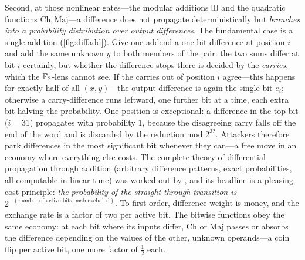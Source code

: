 Second, at those nonlinear gates---the modular additions $\boxplus$ and
the quadratic functions $\mathrm{Ch}, \mathrm{Maj}$---a difference does
not propagate deterministically but \emph{branches into a probability
distribution over output differences}. The fundamental case is a single
addition (\cref{fig:diffadd}). Give one addend a one-bit difference at
position $i$ and add the same unknown $y$ to both members of the pair:
the two sums differ at bit $i$ certainly, but whether the difference
stops there is decided by the \emph{carries}, which the $\mathbb{F}_2$-lens
cannot see. If the carries out of position $i$ agree---this happens for
exactly half of all $(x,y)$---the output difference is again the single
bit $e_i$; otherwise a carry-difference runs leftward, one further bit
at a time, each extra bit halving the probability. One position is
exceptional: a difference in the top bit ($i = 31$) propagates with
probability $1$, because the disagreeing carry falls off the end of the
word and is discarded by the reduction mod $2^{32}$. Attackers
therefore park differences in the most significant bit whenever they
can---a free move in an economy where everything else costs. The
complete theory of differential propagation through addition (arbitrary
difference patterns, exact probabilities, all computable in linear
time) was worked out by \citet{LipmaaMoriai2001}, and its headline is a
pleasing cost principle: \emph{the probability of the straight-through
transition is $2^{-(\text{number of active bits, msb excluded})}$}. To
first order, difference weight is money, and the exchange rate is a
factor of two per active bit. The bitwise functions obey the same
economy: at each bit where its inputs differ, $\mathrm{Ch}$ or
$\mathrm{Maj}$ passes or absorbs the difference depending on the values
of the other, unknown operands---a coin flip per active bit, one more
factor of $\tfrac12$ each.

